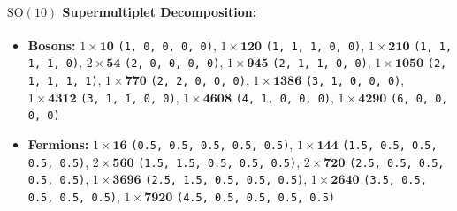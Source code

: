 \documentclass[11pt,a4paper]{article}
\begin{document}
\paragraph{$\mathrm{SO}(10)$ Supermultiplet Decomposition:}
\begin{itemize}
    \item \textbf{Bosons:} $1 \times \mathbf{10}$ \texttt{(1, 0, 0, 0, 0)}, $1 \times \mathbf{120}$ \texttt{(1, 1, 1, 0, 0)}, $1 \times \mathbf{210}$ \texttt{(1, 1, 1, 1, 0)}, $2 \times \mathbf{54}$ \texttt{(2, 0, 0, 0, 0)}, $1 \times \mathbf{945}$ \texttt{(2, 1, 1, 0, 0)}, $1 \times \mathbf{1050}$ \texttt{(2, 1, 1, 1, 1)}, $1 \times \mathbf{770}$ \texttt{(2, 2, 0, 0, 0)}, $1 \times \mathbf{1386}$ \texttt{(3, 1, 0, 0, 0)}, $1 \times \mathbf{4312}$ \texttt{(3, 1, 1, 0, 0)}, $1 \times \mathbf{4608}$ \texttt{(4, 1, 0, 0, 0)}, $1 \times \mathbf{4290}$ \texttt{(6, 0, 0, 0, 0)}
    \item \textbf{Fermions:} $1 \times \mathbf{16}$ \texttt{(0.5, 0.5, 0.5, 0.5, 0.5)}, $1 \times \mathbf{144}$ \texttt{(1.5, 0.5, 0.5, 0.5, 0.5)}, $2 \times \mathbf{560}$ \texttt{(1.5, 1.5, 0.5, 0.5, 0.5)}, $2 \times \mathbf{720}$ \texttt{(2.5, 0.5, 0.5, 0.5, 0.5)}, $1 \times \mathbf{3696}$ \texttt{(2.5, 1.5, 0.5, 0.5, 0.5)}, $1 \times \mathbf{2640}$ \texttt{(3.5, 0.5, 0.5, 0.5, 0.5)}, $1 \times \mathbf{7920}$ \texttt{(4.5, 0.5, 0.5, 0.5, 0.5)}
\end{itemize}
\end{document}
